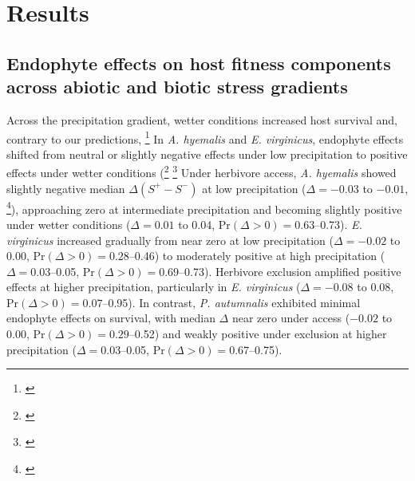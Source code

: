 \documentclass[12pt]{article}\usepackage[]{graphicx}\usepackage[dvipsnames]{xcolor}
\newcommand{\tom}[2]{{\color{red}{#1}}\footnote{\textit{\color{red}{#2}}}}
\begin{document}
\section*{Results}
\subsection*{Endophyte effects on host fitness components across abiotic and biotic stress gradients}
Across the precipitation gradient, wetter conditions increased host survival and, contrary to our predictions, \tom{endophyte effects on survival consistently increased as abiotic stress decreased across the three grasses.}{I am a little concerned that this result is over-stated. Mostly, endo effects on survival were neutral, and some of the ``significant'' effects occurred in extrapolated conditions.}
In \textit{A. hyemalis} and \textit{E. virginicus}, endophyte effects shifted from neutral or slightly negative effects under low precipitation to positive effects under wetter conditions (\tom{Fig.~\ref{fig:Surv}a, b;}{I would use more specific references to the survival figure in this paragraph, as you do here.} \tom{Fig.~\ref{sup:allstat}).}{I think this supplement figure is actually the most convincing figure in the paper, and I would suggest moving it to the main text. The legend says the plots show median delta, but I don't think this is correct because you are plotting posterior probability greater than zero, so that cannot be a median.}
Under herbivore access, \textit{A. hyemalis} showed slightly negative median $\Delta (S^+ - S^-)$ at low precipitation ($\Delta=-0.03$ to $-0.01$, \tom{$\mathrm{Pr}(\Delta>0)=0.21$--0.38}{It is not clear what these ranges are meant to represent.}), approaching zero at intermediate precipitation and becoming slightly positive under wetter conditions ($\Delta=0.01$ to 0.04, $\mathrm{Pr}(\Delta>0)=0.63$--0.73).
\textit{E. virginicus} increased gradually from near zero at low precipitation ($\Delta=-0.02$ to $0.00$, $\mathrm{Pr}(\Delta>0)=0.28$--0.46) to moderately positive at high precipitation ($\Delta=0.03$--0.05, $\mathrm{Pr}(\Delta>0)=0.69$--0.73).
Herbivore exclusion amplified positive effects at higher precipitation, particularly in \textit{E. virginicus} ($\Delta=-0.08$ to 0.08, $\mathrm{Pr}(\Delta>0)=0.07$--0.95).
In contrast, \textit{P. autumnalis} exhibited minimal endophyte effects on survival, with median $\Delta$ near zero under access ($-0.02$ to 0.00, $\mathrm{Pr}(\Delta>0)=0.29$--0.52) and weakly positive under exclusion at higher precipitation ($\Delta=0.03$--0.05, $\mathrm{Pr}(\Delta>0)=0.67$--0.75).  
\end{document}

